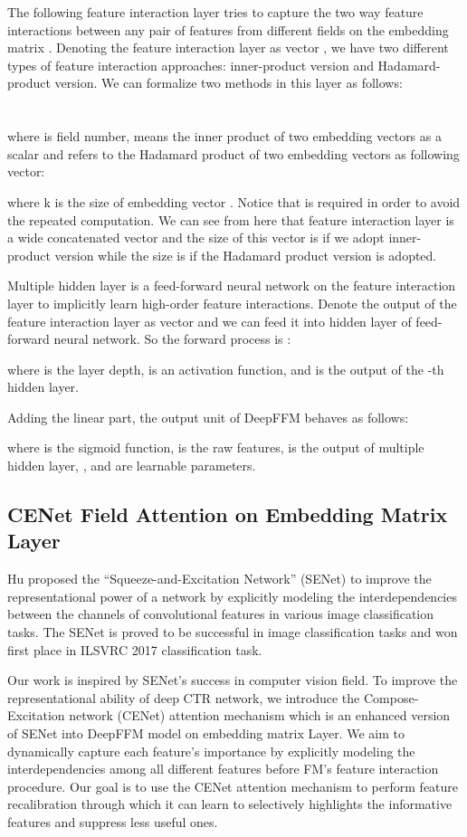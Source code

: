 \documentclass{article}
\begin{document}
The following feature interaction layer tries to capture the two way feature interactions between any pair of features from different fields on the embedding matrix . Denoting the feature interaction layer as vector , we have two different types of feature interaction approaches: inner-product version and Hadamard-product version. We can formalize two methods in this layer as follows: \\
 \\
\\
\noindent where  is field number,  means the inner product of two embedding vectors as a scalar  and  refers to the Hadamard product of two embedding vectors as following vector:



\noindent where k is the size of embedding vector . Notice that  is required in order to avoid the repeated computation.   We can see from here that feature interaction layer  is a wide concatenated vector and the size of this vector is  if we adopt inner-product version while the size is  if the Hadamard product version is adopted.


Multiple hidden layer is a feed-forward neural network on the feature interaction layer to implicitly learn high-order feature interactions. Denote the output of the feature interaction layer as vector  and we can feed it into hidden layer of feed-forward neural network. So the forward process is :


where  is the layer depth,  is an activation function, and  is the output of the -th hidden layer.

 Adding the linear part, the output unit of DeepFFM behaves as follows:

where  is the sigmoid function,  is the raw features,  is the output of multiple hidden layer, ,  and  are learnable parameters. 


\subsection{CENet Field Attention on Embedding Matrix Layer}
Hu proposed the ``Squeeze-and-Excitation Network'' (SENet) \cite{hu2017squeeze} to improve the representational power of a network by explicitly modeling the interdependencies between the channels of convolutional features in various image classification tasks. The SENet is proved to be successful in image classification tasks and won first place in ILSVRC 2017 classification task. 


Our work is inspired by SENet's success in computer vision field. To improve the representational ability of deep CTR network, we introduce the Compose-Excitation network (CENet)  attention mechanism which is an enhanced version of SENet into DeepFFM model on embedding matrix Layer. We aim to dynamically capture each feature's importance by explicitly modeling the interdependencies among all different features before FM's feature interaction procedure. Our goal is to use the CENet attention mechanism to perform feature recalibration through which it can learn to selectively highlights the informative features and suppress less useful ones.
\end{document}
